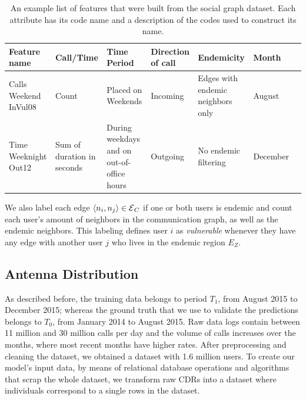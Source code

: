 \begin{table}[ht]
	\caption{An example list of features that were built from the social graph dataset.
Each attribute has its code name and a description of the codes used to construct its name.}
\label{tab:data_example}
	\footnotesize
	\centering
	\begin{tabular} {|p{1.5cm}|p{1.5cm}|p{2cm}|p{1.5cm}|p{2cm}|p{1.5cm}|p{1cm}}
		\hline
		Feature name & Call/Time & Time Period & Direction of call & Endemicity & Month \\
		\hline
		Calls Weekend InVul08    & Count & Placed on Weekends & Incoming & Edges with endemic neighbors only & August\\
		\hline
		Time Weeknight Out12 & Sum of duration in seconds & During weekdays and on out-of-office hours & Outgoing   & No endemic filtering   & December \\
		\hline
	\end{tabular}
\end{table}




We also label each edge $\left< n_i, n_j \right> \in \operatorname{\mathcal{E}}_C$ if one or both users is endemic and count each user's amount of neighbors in the communication graph, as well as the endemic neighbors.
This labeling defines user $i$ as \textit{vulnerable} whenever they have any edge with another user $j$ who lives in the endemic region $E_Z$.


\subsection{Antenna Distribution}\label{subsection:antenna_distribution}

As described before, the training data belongs to period $T_1$, from August 2015 to December 2015;
whereas the ground truth that we use to validate the predictions belongs to $T_0$, from January 2014 to August 2015.
Raw data logs contain between 11 million and 30 million calls per day and the volume of calls increases over the months, where most recent months have higher rates.
After preprocessing and cleaning the dataset, we obtained a dataset with 1.6 million users.
To create our model's input data, by means of relational database operations and algorithms that scrap the whole dataset, we transform raw CDRs into a dataset where individuals correspond to a single rows in the dataset.


